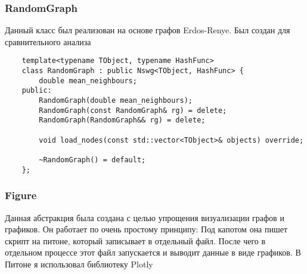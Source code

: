 \subsubsection{RandomGraph}

Данный класс был реализован на основе графов Erdos-Renye. Был создан для срав\-нительного анализа

\begin{verbatim}
    template<typename TObject, typename HashFunc>
    class RandomGraph : public Nswg<TObject, HashFunc> {
        double mean_neighbours;
    public:
        RandomGraph(double mean_neighbours);
        RandomGraph(const RandomGraph& rg) = delete;
        RandomGraph(RandomGraph&& rg) = delete;

        void load_nodes(const std::vector<TObject>& objects) override;

        ~RandomGraph() = default;
    };
\end{verbatim}

\subsubsection{Figure}

Данная абстракция была создана с целью упрощения визуализации графов и гра\-фиков.
Он работает по очень простому принципу: Под капотом она пишет скрипт на питоне, который
записывает в отдельный файл. После чего в отдельном процессе этот файл запускается и 
выводит данные в виде графиков. В Питоне я использовал библиотеку Plotly


